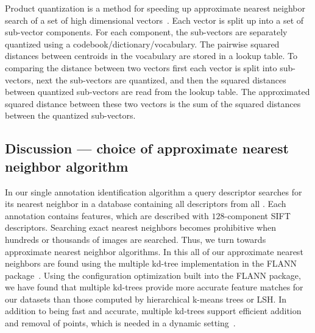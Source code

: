             Product quantization is a method for speeding up
              approximate nearest neighbor search of a set of high
              dimensional
              vectors~\cite{jegou_product_2011,ge_optimized_2013}.
            Each vector is split up into a set of sub-vector
              components.
            For each component, the sub-vectors are separately
              quantized using a codebook/dictionary/vocabulary.
            The pairwise squared distances between centroids in the
              vocabulary are stored in a lookup table.
            To comparing the distance between two vectors first each
              vector is split into sub-vectors, next the sub-vectors are
              quantized, and then the squared distances between quantized
              sub-vectors are read from the lookup table.
            The approximated squared distance between these two vectors
              is the sum of the squared distances between the quantized
              sub-vectors.

        \subsection{Discussion --- choice of approximate nearest neighbor algorithm}

            In our single annotation identification algorithm a query
              descriptor searches for its nearest neighbor in a database
              containing all descriptors from all \exemplars{}.
            Each annotation contains  features, which
              are described with $128$-component SIFT descriptors.
            Searching exact nearest neighbors becomes prohibitive when
              hundreds or thousands of images are searched.
            Thus, we turn towards approximate nearest neighbor
              algorithms.
            In this \thesis{} all of our approximate nearest neighbors
              are found using the multiple kd-tree implementation in the
              FLANN package~\cite{muja_fast_2009}.
            Using the configuration optimization built into the FLANN
              package, we have found that multiple kd-trees provide more
              accurate feature matches for our datasets than those
              computed by hierarchical k-means trees or LSH{}.
            In addition to being fast and accurate, multiple kd-trees
              support efficient addition and removal of points, which is
              needed in a dynamic
              setting~\cite{silpaanan_optimised_2008}.






